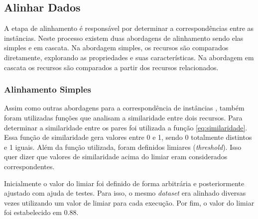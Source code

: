 \subsection{Alinhar Dados}
A etapa de alinhamento é responsável por determinar a correspondências entre as instâncias. Neste processo existem duas abordagens de alinhamento sendo elas simples e em cascata. Na abordagem simples, os recursos são comparados diretamente, explorando as propriedades e suas características. Na abordagem em cascata os recursos são comparados a partir dos recursos relacionados.

\subsubsection{Alinhamento Simples}
Assim como outras abordagens para a correspondência de instâncias \cite{zhang2016rimom}, também foram utilizadas funções que analisam a similaridade entre dois recursos. Para determinar a similaridade entre os pares foi utilizada a função \ref{eq:similaridade}. Essa função de similaridade gera valores entre 0 e 1, sendo 0 totalmente distintos e 1 iguais. Além da função utilizada, foram definidos limiares (\textit{threshold}). Isso quer dizer que valores de similaridade acima do limiar eram considerados correspondentes. 

Inicialmente o valor do limiar foi definido de forma arbitrária e posteriormente ajustado com ajuda de testes. Para isso, o mesmo \textit{dataset} era alinhado diversas vezes utilizando um valor de limiar para cada execução. Por fim, o valor do limiar foi estabelecido em 0.88.
% 
% 
%
%


